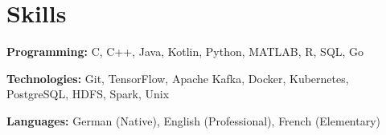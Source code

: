 \documentclass[letterpaper,11pt]{article}
\newcommand{\resumeSubHeadingListStart}{\begin{itemize}[leftmargin=0.15in, label={}]}
\newcommand{\resumeSubHeadingListEnd}{\end{itemize}}
\begin{document}

\section{Skills}
  \vspace{2pt}
  \resumeSubHeadingListStart
    \small{\item{
        \textbf{Programming:}{ C, C++, Java, Kotlin, Python, MATLAB, R, SQL, Go} \\ \vspace{3pt}
        
        \textbf{Technologies:}{ Git, TensorFlow, Apache Kafka, Docker, Kubernetes, PostgreSQL, HDFS, Spark, Unix} \\ \vspace{3pt}
        
        \textbf{Languages:}{ German (Native), English (Professional), French (Elementary)}
    }}
  \resumeSubHeadingListEnd




        




    
\end{document}
